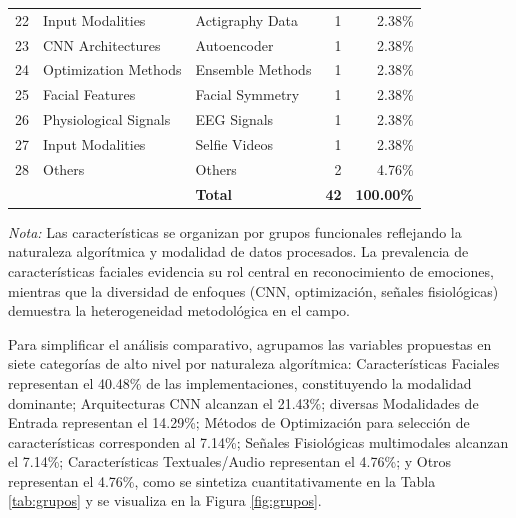 \documentclass{ieeeaccess}
\begin{document}
\begin{table}[htbp]
\begin{tabular}{|r|p{50pt}|p{70pt}|r|r|}
			22 & Input Modalities & Actigraphy Data & 1 & 2.38\% \\
			23 & CNN Architectures & Autoencoder & 1 & 2.38\% \\
			24 & Optimization Methods & Ensemble Methods & 1 & 2.38\% \\
			25 & Facial Features & Facial Symmetry & 1 & 2.38\% \\
			26 & Physiological Signals & EEG Signals & 1 & 2.38\% \\
			27 & Input Modalities & Selfie Videos & 1 & 2.38\% \\
			28 & Others & Others & 2 & 4.76\% \\
			\hline
			& & \textbf{Total} & \textbf{42} & \textbf{100.00\%} \\
			\hline
		\end{tabular}
		\begin{flushleft}
			\small \textit{Nota:} Las características se organizan por grupos funcionales reflejando la naturaleza algorítmica y modalidad de datos procesados. La prevalencia de características faciales evidencia su rol central en reconocimiento de emociones, mientras que la diversidad de enfoques (CNN, optimización, señales fisiológicas) demuestra la heterogeneidad metodológica en el campo.
		\end{flushleft}
	\end{table}
	
	Para simplificar el análisis comparativo, agrupamos las variables propuestas en siete categorías de alto nivel por naturaleza algorítmica: Características Faciales representan el 40.48\% de las implementaciones, constituyendo la modalidad dominante; Arquitecturas CNN alcanzan el 21.43\%; diversas Modalidades de Entrada representan el 14.29\%; Métodos de Optimización para selección de características corresponden al 7.14\%; Señales Fisiológicas multimodales alcanzan el 7.14\%; Características Textuales/Audio representan el 4.76\%; y Otros representan el 4.76\%, como se sintetiza cuantitativamente en la Tabla \ref{tab:grupos} y se visualiza en la Figura \ref{fig:grupos}.
	
\end{document}
